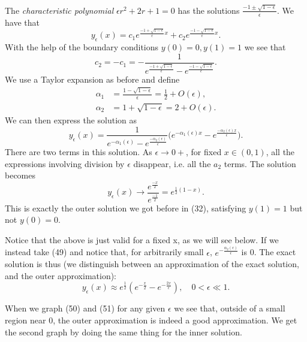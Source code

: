 \documentclass[12pt]{article}
\begin{document}
The \textit{characteristic polynomial} $\epsilon r^2 +2r + 1 = 0$ has
the solutions $\frac{-1 \pm \sqrt{1-\epsilon}}{\epsilon}$. We have
that
\begin{equation}
y_{\epsilon}(x)=c_1 e^{\frac{-1 + \sqrt{1-\epsilon}}{\epsilon} x} + c_2
e^{\frac{-1 - \sqrt{1-\epsilon}}{\epsilon} x}.
\end{equation}
With the help of the boundary conditions $y(0)=0, y(1)=1$ we see that
\begin{equation}
  c_2 = - c_1 = - \frac{1}{e^{\frac{-1 + \sqrt{1-\epsilon}}{\epsilon}}
    - e^{\frac{-1 - \sqrt{1-\epsilon}}{\epsilon}}}.
\end{equation}
We use a Taylor expansion as before and define
\begin{align}
  \alpha_1 &= \frac{1 - \sqrt{1-\epsilon}}{\epsilon} = \frac{1}{2} + O(\epsilon), \\
  \alpha_2 &= 1+ \sqrt{1-\epsilon} = 2 + O(\epsilon).
\end{align}
We can then express the solution as
\begin{equation}
  y_{\epsilon}(x) = \frac{1}{e^{-\alpha_1(\epsilon)} - e^{\frac{-\alpha_2(\epsilon)}{\epsilon}}} \Big(e^{-\alpha_1(\epsilon)x} - e^{\frac{-\alpha_2(\epsilon)x}{\epsilon}}\Big).
\end{equation}
There are two terms in this solution. As $\epsilon \to 0+$, for fixed
$x \in (0,1)$, all the expressions involving division by $\epsilon$
disappear, i.e. all the $a_2$ terms. The solution becomes
\begin{equation}
  y_{\epsilon}(x) \to \frac{e^{\frac{-x}{2}}}{e^{\frac{-1}{2}}} = e^{\frac{1}{2}(1-x)}.
\end{equation}
This is exactly the outer solution we got before in (32), satisfying
$y(1)=1$ but not $y(0)=0$.

Notice that the above is just valid for a fixed x, as we will see
below. If we instead take (49) and notice that, for arbitrarily small
$\epsilon$, $e^{-\frac{\alpha_2(\epsilon)}{\epsilon}}$ is 0. The exact
solution is thus (we distinguish between an approximation of the exact
solution, and the outer approximation):
\begin{equation}
  y_{\epsilon}(x) \approx e^{\frac{1}{2}}(e^{-\frac{x}{2}} -
  e^{-\frac{2x}{\epsilon}}), \quad 0 < \epsilon \ll 1.
\end{equation}

When we graph (50) and (51) for any given $\epsilon$ we see that,
outside of a small region near 0, the outer approximation is indeed a
good approximation. We get the second graph by doing the same thing
for the inner solution.
\end{document}
